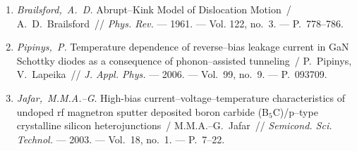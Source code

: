 \begin{enumerate}[label=\arabic*$^*$.,leftmargin=0em,itemindent=3em]
\item
\emph{Brailsford,~A.~D.} Abrupt--Kink Model of Dislocation Motion~/
  A.~D.~Brailsford~// \emph{Phys. Rev.} ---
  1961. ---
  Vol. 122, no.~3. ---
  P.~778--786.

\item
\emph{Pipinys,~P.} Temperature dependence of reverse--bias leakage current
  in {G}a{N} {S}chottky diodes as a consequence of phonon--assisted tunneling~/
  P.~Pipinys, V.~Lapeika~// \emph{J. Appl. Phys.} ---
  2006. --- 
  Vol.~99, no.~9. ---
  P.~093709.

\item
\emph{Jafar,~M.M.A.--G}. High-bias current--voltage--temperature
  characteristics of undoped rf magnetron sputter deposited boron carbide
  ({B}$_5${C})/p--type crystalline silicon heterojunctions~/ M.M.A.--G.~Jafar~// \emph{Semicond. Sci. Technol.} ---
  2003. ---
  Vol.~18, no.~1. ---
  P.~7--22.
\end{enumerate}
